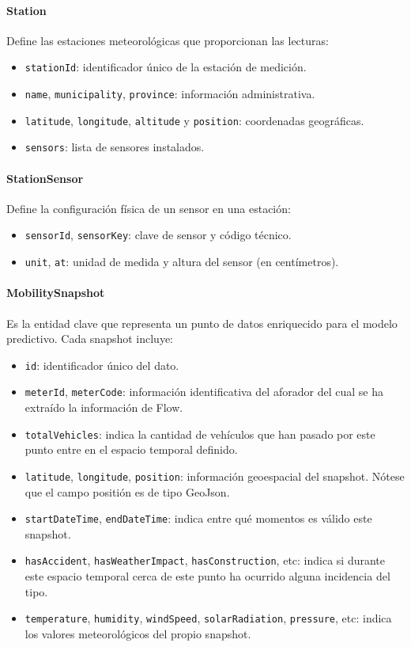 \paragraph{Station}
Define las estaciones meteorológicas que proporcionan las lecturas:
\begin{itemize}
	\item \texttt{stationId}: identificador único de la estación de medición.
	\item \texttt{name}, \texttt{municipality}, \texttt{province}: información administrativa.
	\item \texttt{latitude}, \texttt{longitude}, \texttt{altitude} y \texttt{position}: coordenadas geográficas.
	\item \texttt{sensors}: lista de sensores instalados.
\end{itemize}

\paragraph{StationSensor}
Define la configuración física de un sensor en una estación:
\begin{itemize}
	\item \texttt{sensorId}, \texttt{sensorKey}: clave de sensor y código técnico.
	\item \texttt{unit}, \texttt{at}: unidad de medida y altura del sensor (en centímetros).
\end{itemize}

\vspace{1em}
\paragraph{MobilitySnapshot}
Es la entidad clave que representa un punto de datos enriquecido para el modelo predictivo. Cada snapshot incluye:
\begin{itemize}
	\item \texttt{id}: identificador único del dato.
	\item \texttt{meterId}, \texttt{meterCode}: información identificativa del aforador del cual se ha extraído la información de Flow.
	\item \texttt{totalVehicles}: indica la cantidad de vehículos que han pasado por este punto entre en el espacio temporal definido.
	\item \texttt{latitude}, \texttt{longitude}, \texttt{position}: información geoespacial del snapshot. Nótese que el campo positión es de tipo GeoJson.
	\item \texttt{startDateTime}, \texttt{endDateTime}: indica entre qué momentos es válido este snapshot.
	\item \texttt{hasAccident}, \texttt{hasWeatherImpact}, \texttt{hasConstruction}, etc: indica si durante este espacio temporal cerca de este punto ha ocurrido alguna incidencia del tipo.
	\item \texttt{temperature}, \texttt{humidity}, \texttt{windSpeed}, \texttt{solarRadiation}, \texttt{pressure}, etc: indica los valores meteorológicos del propio snapshot.
\end{itemize}

